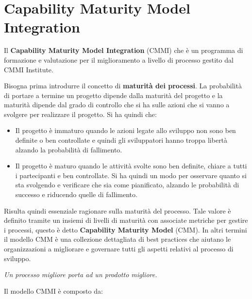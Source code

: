 \chapter{Capability Maturity Model Integration}
Il \textbf{Capability Maturity Model Integration} (CMMI) che è un programma di
formazione e valutazione per il miglioramento a livello di processo gestito dal
CMMI Institute.

Bisogna prima introdurre il concetto di \textbf{maturità dei processi}. La
probabilità di portare a termine un progetto dipende dalla maturità del progetto
e la maturità dipende dal grado di controllo che si ha sulle azioni che si vanno
a svolgere per realizzare il progetto. Si ha quindi che:
\begin{itemize}
      \item Il progetto è immaturo quando le azioni legate allo sviluppo non sono
            ben definite o ben controllate e quindi gli sviluppatori hanno troppa
            libertà alzando la probabilità di fallimento.
      \item Il progetto è maturo quando le attività svolte sono ben definite,
            chiare a tutti i partecipanti e ben controllate. Si ha quindi un modo
            per osservare quanto si sta svolgendo e verificare che sia come
            pianificato, alzando le probabilità di successo e riducendo quelle di
            fallimento.
\end{itemize}
Risulta quindi essenziale ragionare sulla maturità del processo. Tale valore è
definito tramite un insiemi di livelli di maturità con associate metriche per
gestire i processi, questo è detto \textbf{Capability Maturity Model} (CMM). In
altri termini il modello CMM è una collezione dettagliata di best practices che
aiutano le organizzazioni a migliorare e governare tutti gli aspetti relativi al
processo di sviluppo.
\begin{center}
      \textit{Un processo migliore porta ad un prodotto migliore.}
\end{center}
Il modello CMMI è composto da:
